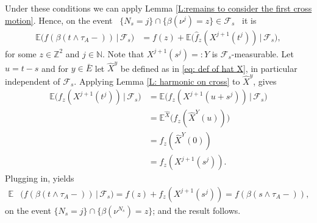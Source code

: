 \documentclass[11pt]{article}
\makeatletter
\renewenvironment{proof}[1][\proofname]{
   \par\pushQED{\qed}\normalfont
   \topsep6\p@\@plus6\p@\relax
   \trivlist\item[\hskip\labelsep\bfseries#1\@addpunct{.}]
   \ignorespaces
}{
   \popQED\endtrivlist\@endpefalse
}
\numberwithin{equation}{section}
\def\Ex{\mathbb{E}}
\makeatother
\begin{document}
\begin{proof}[Proof of Theorem \ref{harmonic function of grid BM}]
  Under these conditions we can apply
  Lemma \ref{L:remains to consider the first cross motion}. 
  Hence, on the event 
  \hbox{
    $\{N_s = j\} \cap 
    \{\beta(\nu^j) = z\} \in \mathcal{F}_s$
  } it is
  \begin{equation}\nonumber
  \begin{split}
    \Ex \big( 
      f(\beta(t \land \tau_A-)) 
            \,\big|\,  \mathcal{F}_s \big)
      &= f(z) + \Ex \big( \hat{f}_z(X^{j+1}(t^j)) 
      \,\big|\, \mathcal{F}_s \big),
  \end{split}
  \end{equation}
  for some $z \in \mathbb{Z}^2$ and $j \in \mathbb{N}$.
  Note that $X^{j+1}(s^j)=:Y$ 
  is $\mathcal{F}_s$-measurable.
  Let $u = t-s$  and for $y \in \bar{E}$ let $\hat{X}^y$ 
  be defined as in \eqref{eq: def of hat X}, 
  in particular independent of $\mathcal{F}_s$. 
  Applying Lemma \ref{L: harmonic on cross} 
  to $\hat{X}^y$, gives
  \begin{equation}\nonumber
    \begin{split}
      \Ex \big( 
        f_z(X^{j+1}(t^j))
          \,\big|\,  \mathcal{F}_s \big) 
      &= \Ex \big( 
        f_z(X^{j+1}(u + s^j)) 
          \,\big|\,  \mathcal{F}_s \big)\\
      &= \Ex^{\hat{X}} \big(
          f_z(\hat{X}^Y(u)) \big)\\ 
      &= f_z(\hat{X}^Y(0)) \\
      &= f_z(X^{j+1}(s^j)).
    \end{split}
  \end{equation} 
  Plugging in, yields
  \begin{equation}\nonumber
    \begin{split}
        \Ex &\big( 
        f(\beta(t \land \tau_A-)) 
          \,\big|\,  \mathcal{F}_s \big)
      = f(z) + f_z(X^{j+1}(s^j))
      = f(\beta(s \land \tau_A-)),
    \end{split}
  \end{equation}
  on the event 
  $\{N_s = j\} \cap \{\beta(\nu^{N_s}) = z\}$;
  and the result follows.
\end{proof}
\end{document}
